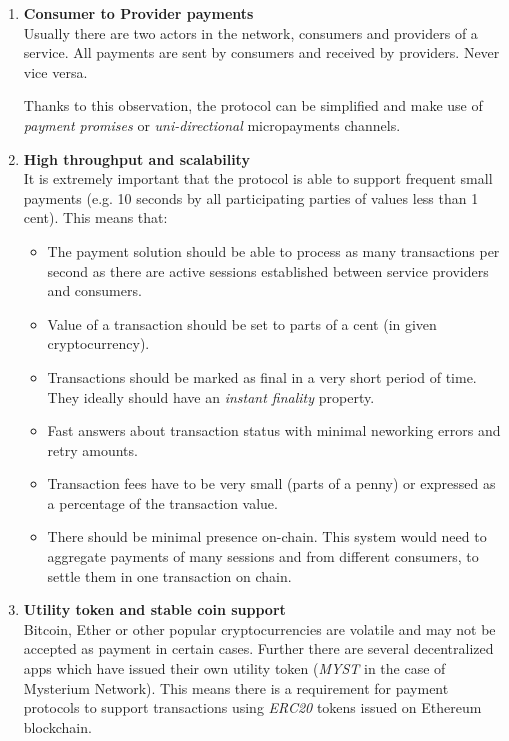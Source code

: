 \documentclass[a4paper,12pt]{article}
\begin{document}
\begin{enumerate}
    \item \textbf{Consumer to Provider payments}\\
    Usually there are two actors in the network, consumers and providers of a 
    service. All payments are sent by consumers and received by providers. Never 
    vice versa.

    Thanks to this observation, the protocol can be simplified and make use of 
    \textit{payment promises} or \textit{uni-directional} micropayments channels.

    \item \textbf{High throughput and scalability}\\
    It is extremely important that the protocol is able to support frequent small 
    payments (e.g. 10 seconds by all participating parties of values less than 1 
    cent). This means that:
    \begin{itemize}
        \item The payment solution should be able to process as many transactions 
        per second as there are active sessions established between service 
        providers and consumers.
        \item Value of a transaction should be set to parts of a cent (in given 
        cryptocurrency).
        \item Transactions should be marked as final in a very short period of 
        time. They ideally should have an \textit{instant finality} property.
        \item Fast answers about transaction status with minimal neworking errors 
        and retry amounts.
        \item Transaction fees have to be very small (parts of a penny) or 
        expressed as a percentage of the transaction value.
        \item There should be minimal presence on-chain. This system would need 
        to aggregate payments of many sessions and from different consumers, to 
        settle them in one transaction on chain.
    \end{itemize}

    \item \textbf{Utility token and stable coin support}\\
    Bitcoin, Ether or other popular cryptocurrencies are volatile and may not be 
    accepted as payment in certain cases. Further there are several decentralized 
    apps which have issued their own utility token (\textit{MYST} in the case of 
    Mysterium Network). This means there is a requirement for payment protocols 
    to support transactions using \textit{ERC20} tokens issued on Ethereum 
    blockchain.


\end{enumerate}
\end{document}
